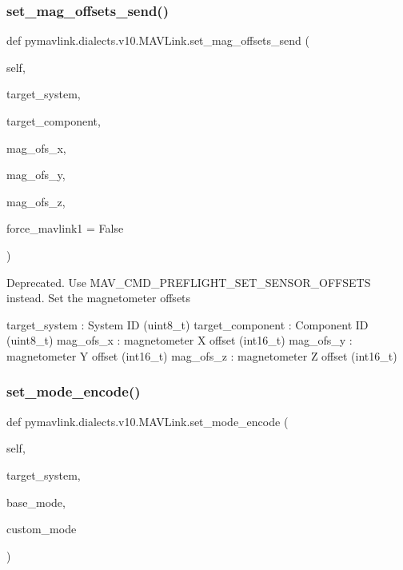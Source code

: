 \begin{DoxyVerb}
\begin{DoxyVerb}
\begin{DoxyVerb}
\begin{DoxyVerb}
\begin{DoxyVerb}
\begin{DoxyVerb}
\begin{DoxyVerb}
\begin{DoxyVerb}
\begin{DoxyVerb}
\begin{DoxyVerb}
\subsubsection{\texorpdfstring{set\+\_\+mag\+\_\+offsets\+\_\+send()}{set\_mag\_offsets\_send()}}
{\footnotesize\ttfamily def pymavlink.\+dialects.\+v10.\+M\+A\+V\+Link.\+set\+\_\+mag\+\_\+offsets\+\_\+send (\begin{DoxyParamCaption}\item[{}]{self,  }\item[{}]{target\+\_\+system,  }\item[{}]{target\+\_\+component,  }\item[{}]{mag\+\_\+ofs\+\_\+x,  }\item[{}]{mag\+\_\+ofs\+\_\+y,  }\item[{}]{mag\+\_\+ofs\+\_\+z,  }\item[{}]{force\+\_\+mavlink1 = {\ttfamily False} }\end{DoxyParamCaption})}

\begin{DoxyVerb}Deprecated. Use MAV_CMD_PREFLIGHT_SET_SENSOR_OFFSETS instead. Set the
magnetometer offsets

target_system             : System ID (uint8_t)
target_component          : Component ID (uint8_t)
mag_ofs_x                 : magnetometer X offset (int16_t)
mag_ofs_y                 : magnetometer Y offset (int16_t)
mag_ofs_z                 : magnetometer Z offset (int16_t)\end{DoxyVerb}
 \mbox{\label{classpymavlink_1_1dialects_1_1v10_1_1MAVLink_a9c24acae219f90628cfb9118892539bc}} 
\subsubsection{\texorpdfstring{set\+\_\+mode\+\_\+encode()}{set\_mode\_encode()}}
{\footnotesize\ttfamily def pymavlink.\+dialects.\+v10.\+M\+A\+V\+Link.\+set\+\_\+mode\+\_\+encode (\begin{DoxyParamCaption}\item[{}]{self,  }\item[{}]{target\+\_\+system,  }\item[{}]{base\+\_\+mode,  }\item[{}]{custom\+\_\+mode }\end{DoxyParamCaption})}


\end{DoxyVerb}
\end{DoxyVerb}
\end{DoxyVerb}
\end{DoxyVerb}
\end{DoxyVerb}
\end{DoxyVerb}
\end{DoxyVerb}
\end{DoxyVerb}
\end{DoxyVerb}
\end{DoxyVerb}
